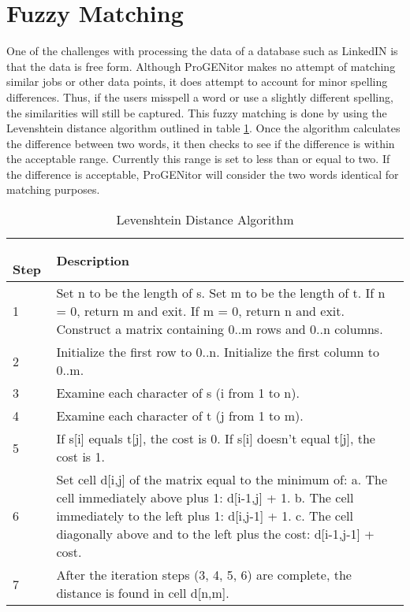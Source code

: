 \section{Fuzzy Matching}
\label{sect:fuzzy-matching}
One of the challenges with processing the data of a database such as LinkedIN is
that the data is free form.  Although ProGENitor makes no attempt of matching
similar jobs or other data points, it does attempt to account for minor spelling
differences.  Thus, if the users misspell a word or use a slightly different
spelling, the similarities will still be captured. This fuzzy matching is
done by using the Levenshtein distance algorithm\cite{fuzzy} outlined in table
\ref{tab:lev-dist}.  Once the algorithm calculates the difference between two
words, it then checks to see if the difference is within the acceptable range. 
Currently this range is set to less than or equal to two.  If the difference is
acceptable, ProGENitor will consider the two words identical for matching
purposes.


\begin{table}[H]
  \centering
  \begin{tabular}{|p{.5in}|p{4in}|}
  \hline
  \
  Step & Description \\
  \hline\hline
  1 &  Set n to be the length of s.\newline 
  Set m to be the length of t.\newline
  If n = 0, return m and exit.\newline
  If m = 0, return n and exit.\newline
  Construct a matrix containing 0..m rows and 0..n columns.  \\ \hline 
  2 &  	Initialize the first row to 0..n.\newline
  Initialize the first column to 0..m.\\ \hline 
  3 & Examine each character of s (i from 1 to n). \\ \hline
  4 & Examine each character of t (j from 1 to m). \\ \hline
  5 &  	If s[i] equals t[j], the cost is 0.\newline
  If s[i] doesn't equal t[j], the cost is 1. \\\hline 
  6 &  	Set cell d[i,j] of the matrix equal to the minimum of:\newline
  a. The cell immediately above plus 1: d[i-1,j] + 1.\newline
  b. The cell immediately to the left plus 1: d[i,j-1] + 1.\newline
  c. The cell diagonally above and to the left plus the cost: d[i-1,j-1] + cost.\\ \hline
  7 & After the iteration steps (3, 4, 5, 6) are complete, the distance is found in cell d[n,m]. \\ \hline
  \end{tabular}
  \label{tab:lev-dist}
  \caption{Levenshtein Distance Algorithm}
\end{table}

